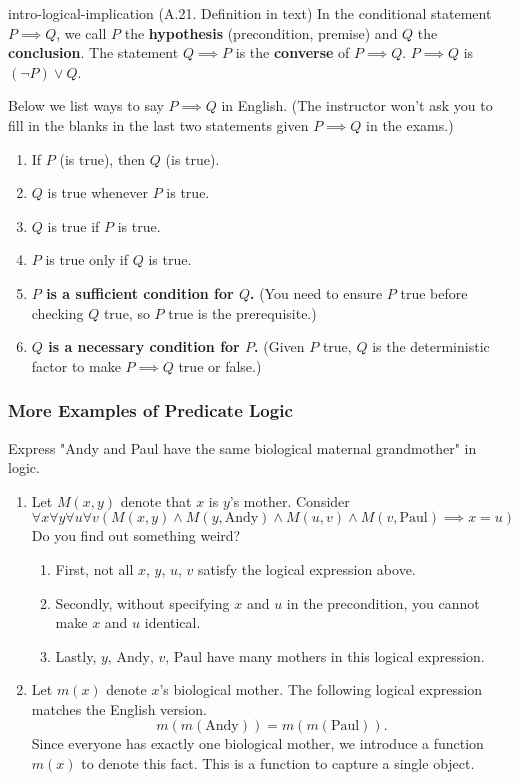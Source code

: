 \documentclass[../src/handouts/main.tex]{subfiles}
\begin{document}
\begin{definition}{}{intro-logical-implication}
  (A.21. Definition in text) In the conditional statement $P \implies Q$, we call $P$ the \textbf{hypothesis} (precondition, premise) and $Q$ the \textbf{conclusion}. The statement $Q \implies P$ is the \textbf{converse} of $P \implies Q$. $P \implies Q$ is $(\neg P) \lor Q$.

  Below we list ways to say $P \implies Q$ in English. (The instructor won't ask you to fill in the blanks in the last two statements given $P \implies Q$ in the exams.)
  \begin{enumerate}
    \item If $P$ (is true), then $Q$ (is true).
    \item $Q$ is true whenever $P$ is true.
    \item $Q$ is true if $P$ is true.
    \item $P$ is true only if $Q$ is true.
    \item \textbf{$P$ is a sufficient condition for $Q$.} (You need to ensure $P$ true before checking $Q$ true, so $P$ true is the prerequisite.)
    \item \textbf{$Q$ is a necessary condition for $P$.} (Given $P$ true, $Q$ is the deterministic factor to make $P \implies Q$ true or false.)
  \end{enumerate}
\end{definition}

\subsubsection{More Examples of Predicate Logic}

Express "Andy and Paul have the same biological maternal grandmother" in logic.
\begin{enumerate}
  \item Let $M(x, y)$ denote that $x$ is $y$'s mother. Consider
    $$
      \forall x \forall y \forall u \forall v(M(x, y) \land M(y, \text{Andy}) \land M(u, v) \land M(v, \text{Paul}) \implies x = u)
    $$
    Do you find out something weird?
    \begin{enumerate}
      \item First, not all $x,\, y,\, u,\, v$ satisfy the logical expression above.
      \item Secondly, without specifying $x$ and $u$ in the precondition, you cannot make $x$ and $u$ identical.
      \item Lastly, $y,\, \text{Andy},\, v,\, \text{Paul}$ have many mothers in this logical expression.
    \end{enumerate}
  \item Let $m(x)$ denote $x$'s biological mother. The following logical expression matches the English version.
    $$
      m(m(\text{Andy}))=m(m(\text{Paul})).
    $$
    Since everyone has exactly one biological mother, we introduce a function $m(x)$ to denote this fact. This is a function to capture a single object.
\end{enumerate}
\end{document}
